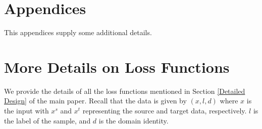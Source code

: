 \documentclass{article}
\begin{document}












\appendix
\section*{Appendices}

This appendices supply some additional details.%
\section{More Details on Loss Functions}
\label{apploss}

We provide the details of all the loss functions mentioned in Section \ref{Detailed Design} of the main paper. Recall that the data is given by $(x,l,d)$ where $x$ is the input with $x^s$ and $x^t$ representing the source and target data, respectively. $l$ is the label of the sample, and $d$ is the domain identity. 
\end{document}

